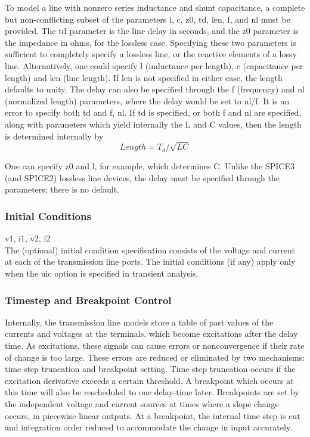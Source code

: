 To model a line with nonzero series inductance and shunt capacitance,
a complete but non-conflicting subset of the parameters {\vt l}, {\vt
c}, {\vt z0}, {\vt td}, {\vt len}, {\vt f}, and {\vt nl} must be
provided.  The {\vt td} parameter is the line delay in seconds, and
the {\vt z0} parameter is the impedance in ohms, for the lossless
case.  Specifying these two parameters is sufficient to completely
specify a lossless line, or the reactive elements of a lossy line. 
Alternatively, one could specify {\vt l} (inductance per length), {\vt
c} (capacitance per length) and {\vt len} (line length).  If {\vt len}
is not specified in either case, the length defaults to unity.  The
delay can also be specified through the {\vt f} (frequency) and {\vt
nl} (normalized length) parameters, where the delay would be set to
{\vt nl/f}.  It is an error to specify both {\vt td} and {\vt f}, {\vt
nl}.  If {\vt td} is specified, or both {\vt f} and {\vt nl} are
specified, along with parameters which yield internally the L and C
values, then the length is determined internally by
\begin{displaymath}
Length = T_d/\sqrt{LC}
\end{displaymath}

One can specify {\vt z0} and {\vt l}, for example, which determines C. 
Unlike the SPICE3 (and SPICE2) lossless line devices, the delay must
be specified through the parameters; there is no default.

\subsubsection{Initial Conditions}

\begin{description}
\item{{\vt v1}, {\vt i1}, {\vt v2}, {\vt i2}}\\
The (optional) initial condition specification consists of the voltage
and current at each of the transmission line ports.  The initial
conditions (if any) apply only when the {\vt uic} option is specified
in transient analysis.
\end{description}

\subsubsection{Timestep and Breakpoint Control}

Internally, the transmission line models store a table of past values
of the currents and voltages at the terminals, which become
excitations after the delay time.  As excitations, these signals can
cause errors or nonconvergence if their rate of change is too large. 
These errors are reduced or eliminated by two mechanisms:  time step
truncation and breakpoint setting.  Time step truncation occurs if the
excitation derivative exceeds a certain threshold.  A breakpoint which
occurs at this time will also be rescheduled to one delay-time later. 
Breakpoints are set by the independent voltage and current sources at
times where a slope change occurs, in piecewise linear outputs.  At a
breakpoint, the internal time step is cut and integration order
reduced to accommodate the change in input accurately.

